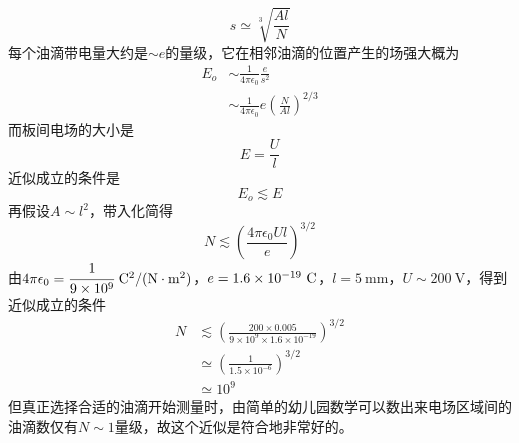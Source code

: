\documentclass[11pt,a4paper]{ctexart}
\newcommand{\beq}{\begin{equation}}
\newcommand{\eeq}{\end{equation}}
\newcommand{\bea}{\begin{equation}\begin{aligned}}
\newcommand{\eea}{\end{aligned}\end{equation}}
\newcommand{\volt}{\mathrm{\ V}}
\begin{document}
\begin{enumerate}
\beq
s \simeq \sqrt[3]{\frac{Al}{N}}
\eeq
每个油滴带电量大约是$\sim e$的量级，它在相邻油滴的位置产生的场强大概为
\bea
E_o &\sim \frac{1}{4\pi \epsilon_0} \frac{e}{s^2} \\
&\sim \frac{1}{4\pi \epsilon_0} e (\frac{N}{Al})^{2/3}
\eea
而板间电场的大小是
\beq
E = \frac{U}{l}
\eeq
近似成立的条件是
\beq
E_o \lesssim E
\eeq
再假设$A \sim l^2$，带入化简得
\beq
N \lesssim  (\frac{4\pi \epsilon_0 Ul}{e})^{3/2}
\eeq
由$4\pi \epsilon_0 = \cfrac{1}{9\times 10^9} \mathrm{\ C^2/(N\cdot m^2)}$，$e = 1.6\times 10^{-19}\mathrm{\ C}$，$l = 5\mathrm{\ mm}$，$U \sim 200\volt$，得到近似成立的条件
\bea
N &\lesssim (\frac{200\times 0.005}{9\times 10^9 \times 1.6\times 10^{-19}})^{3/2} \\
&\simeq (\frac{1}{1.5\times 10^{-6}})^{3/2} \\
&\simeq 10^9
\eea
但真正选择合适的油滴开始测量时，由简单的幼儿园数学可以数出来电场区域间的油滴数仅有$N \sim 1$量级，故这个近似是符合地非常好的。


\end{enumerate}
\end{document}
